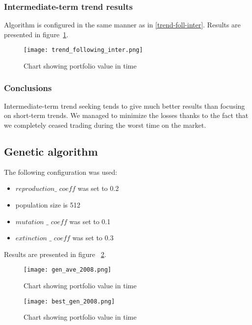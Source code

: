 \subsubsection{Intermediate-term trend results}

Algorithm is configured in the same manner as in \ref{trend-foll-inter}.
Results are presented in figure~\ref{fig:trend_foll_inter}.

\begin{figure}[ht]
  \begin{center}
    \texttt{[image: trend\_following\_inter.png]}
  \end{center}
  \caption{Chart showing portfolio value in time}
  \label{fig:trend_foll_inter}
\end{figure}


\subsubsection{Conclusions}

Intermediate-term trend seeking tends to give much better results than focusing on short-term trends.
We managed to minimize the losses thanks to the fact that we completely ceased trading during the worst time on the market.

\subsection{Genetic algorithm}

The following configuration was used:
\begin{itemize}
  \item $reproduction\_$ $coeff$ was set to 0.2
  \item population size is 512
  \item $mutation$ $\_$ $coeff$ was set to 0.1
  \item $extinction$ $\_$ $coeff$ was set to 0.3
\end{itemize}

Results are presented in figure ~\ref{fig:gen_ave_2008}.

\begin{figure}[ht]
  \begin{center}
    \texttt{[image: gen\_ave\_2008.png]}
  \end{center}
  \caption{Chart showing portfolio value in time}
  \label{fig:gen_ave_2008}
\end{figure}

\begin{figure}[ht]
  \begin{center}
    \texttt{[image: best\_gen\_2008.png]}
  \end{center}
  \caption{Chart showing portfolio value in time}
  \label{fig:gen_best_2008}
\end{figure}

